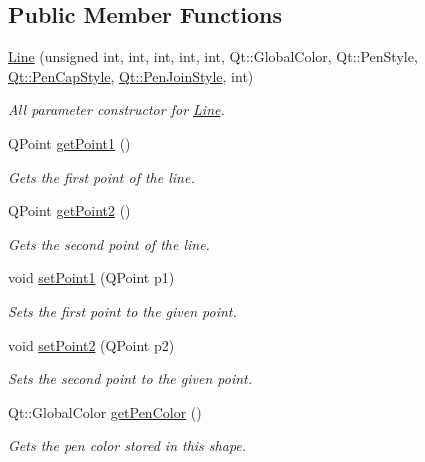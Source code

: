 \subsection*{Public Member Functions}
\begin{DoxyCompactItemize}
\item 
\hyperlink{classLine_abcc71f5940d76af54fb2a8406418dd44}{Line} (unsigned int, int, int, int, int, Qt\+::\+Global\+Color, Qt\+::\+Pen\+Style, \hyperlink{shape__input__file__specs_8txt_a622efdcfef6789d4367974d2fe79019e}{Qt\+::\+Pen\+Cap\+Style}, \hyperlink{shape__input__file__specs_8txt_a007db2043c6063881de2043c05c9c4a9}{Qt\+::\+Pen\+Join\+Style}, int)
\begin{DoxyCompactList}\small\item\em All parameter constructor for \hyperlink{classLine}{Line}. \end{DoxyCompactList}\item 
Q\+Point \hyperlink{classLine_ad0f6a573ebd8220236e7de8202717f97}{get\+Point1} ()
\begin{DoxyCompactList}\small\item\em Gets the first point of the line. \end{DoxyCompactList}\item 
Q\+Point \hyperlink{classLine_aa64a85c213850620e2ca3df153fe7846}{get\+Point2} ()
\begin{DoxyCompactList}\small\item\em Gets the second point of the line. \end{DoxyCompactList}\item 
void \hyperlink{classLine_a671e977e9b5cb104016def1e9e99c5aa}{set\+Point1} (Q\+Point p1)
\begin{DoxyCompactList}\small\item\em Sets the first point to the given point. \end{DoxyCompactList}\item 
void \hyperlink{classLine_acd4ccc2b472817c45f52297c99a8cbf9}{set\+Point2} (Q\+Point p2)
\begin{DoxyCompactList}\small\item\em Sets the second point to the given point. \end{DoxyCompactList}\item 
Qt\+::\+Global\+Color \hyperlink{classLine_a2d9f0fdcc2da8a29ba39660579150863}{get\+Pen\+Color} ()
\begin{DoxyCompactList}\small\item\em Gets the pen color stored in this shape. \end{DoxyCompactList}\item 

\end{DoxyCompactItemize}
